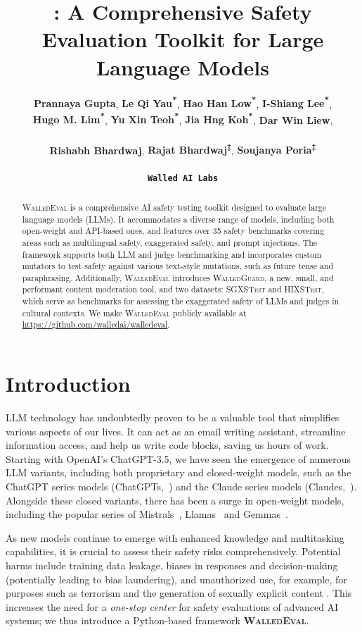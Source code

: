 \documentclass[11pt]{article}
\title{\tool{}: A Comprehensive Safety Evaluation Toolkit for Large Language Models}
\author{
 \textbf{Prannaya Gupta\textsuperscript{}}\Thanks{Independent Researchers,},
 \textbf{Le Qi Yau\textsuperscript{*}},
 \textbf{Hao Han Low\textsuperscript{*}},
 \textbf{I-Shiang Lee\textsuperscript{*}}, \\
 \textbf{Hugo M. Lim\textsuperscript{*}},
 \textbf{Yu Xin Teoh\textsuperscript{*}},
 \textbf{Jia Hng Koh\textsuperscript{*}},
 \textbf{Dar Win Liew}\Thanks{Collaborator from \texttt{Tensorplex Labs,}},
 \\ \\
 \textbf{Rishabh Bhardwaj\Thanks{Lead contributors, email: \texttt{rishabh@walled.ai}}},
 \textbf{Rajat Bhardwaj\textsuperscript{‡}},
 \textbf{Soujanya Poria\textsuperscript{‡}}
 \\ \\
 \texttt{\textbf{Walled AI Labs}}
}
\newcommand{\tool}{\textsc{WalledEval}}
\newcommand{\guard}{\textsc{WalledGuard}}
\newcommand{\dataset}{\textsc{SGXSTest}}
\begin{document}
\maketitle
\begin{abstract}
\tool{} is a comprehensive AI safety testing toolkit designed to evaluate large language models (LLMs). It accommodates a diverse range of models, including both open-weight and API-based ones, and features over 35 safety benchmarks covering areas such as multilingual safety, exaggerated safety, and prompt injections. The framework supports both LLM and judge benchmarking and incorporates custom mutators to test safety against various text-style mutations, such as future tense and paraphrasing. Additionally, \tool{} introduces \guard{}, a new, small, and performant content moderation tool, and two datasets: \dataset{} and \textsc{HIXSTest}, which serve as benchmarks for assessing the exaggerated safety of LLMs and judges in cultural contexts. We make \tool{} publicly available at \url{https://github.com/walledai/walledeval}.
\end{abstract}


\section{Introduction}

LLM technology has undoubtedly proven to be a valuable tool that simplifies various aspects of our lives. It can act as an email writing assistant, streamline information access, and help us write code blocks, saving us hours of work. Starting with OpenAI's ChatGPT-3.5, we have seen the emergence of numerous LLM variants, including both proprietary and closed-weight models, such as the ChatGPT series models (ChatGPTs,~\citet{achiam2023gpt}) and the Claude series models (Claudes,~\citet{Anthropic}). Alongside these closed variants, there has been a surge in open-weight models, including the popular series of Mistrals~\cite{jiang2023mistral}, Llamas~\cite{dubey2024llama} and Gemmas~\cite{team2024gemma}.

As new models continue to emerge with enhanced knowledge and multitasking capabilities, it is crucial to assess their safety risks comprehensively. Potential harms include training data leakage, biases in responses and decision-making (potentially leading to bias laundering), and unauthorized use, for example, for purposes such as terrorism and the generation of sexually explicit content \cite{vidgen2024introducing}. This increases the need for a \textit{one-stop center} for safety evaluations of advanced AI systems; we thus introduce a Python-based framework \textbf{\tool}.
\end{document}

